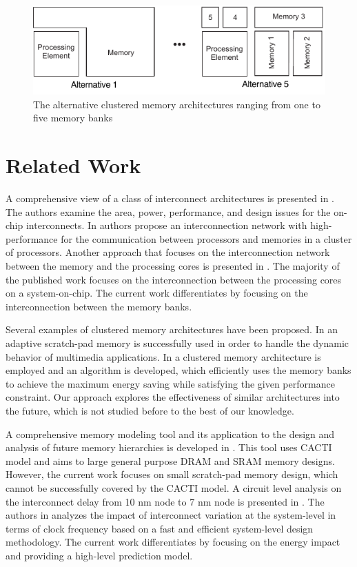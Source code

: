 \begin{figure}
 \centering
 \includegraphics[width = \textwidth]{E/platform.pdf}
  \caption{The alternative clustered memory architectures ranging from one to five memory banks}
 \label{fig:platformE}
 \end{figure}

\section{Related Work}
\label{relatedE}

A comprehensive view of a class of interconnect architectures is presented in \cite{kumar2005interconnections}. 
The authors examine the area, power, performance, and design issues for the on-chip interconnects.
In \cite{rahimi2011fully} authors propose an interconnection network with high-performance for the communication between processors and memories in a cluster of processors.
Another approach that focuses on the interconnection network between the memory and the processing cores is presented in \cite{kang2012high}. 
The majority of the published work focuses on the interconnection between the processing cores on a system-on-chip.
The current work differentiates by focusing on the interconnection between the memory banks.

Several examples of clustered memory architectures have been proposed.
In \cite{cho2009adaptive} an adaptive scratch-pad memory is successfully used in order to handle the dynamic behavior of multimedia applications.
In \cite{wang2005energy} a clustered memory architecture is employed and an algorithm is developed, which efficiently uses the memory banks to achieve the maximum energy saving while satisfying the given performance constraint.
Our approach explores the effectiveness of similar architectures into the future, which is not studied before to the best of our knowledge.

A comprehensive memory modeling tool and its application to the design and analysis of future memory hierarchies is developed in \cite{thoziyoor2008comprehensive}. 
This tool uses CACTI model and aims to large general purpose DRAM and SRAM memory designs.
However, the current work focuses on small scratch-pad memory design, which cannot be successfully covered by the CACTI model.
A circuit level analysis on the interconnect delay from 10 nm node to 7 nm node is presented in \cite{pan2014system}.
The authors in \cite{chen2014interconnect} analyzes the impact of interconnect variation at the system-level in terms of clock frequency based on a fast and efficient system-level design methodology. 
The current work differentiates by focusing on the energy impact and providing a high-level prediction model.

